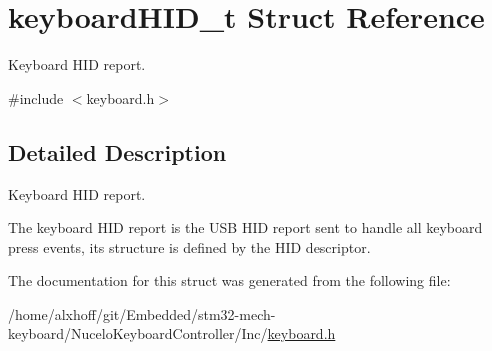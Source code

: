 \hypertarget{structkeyboardHID__t}{}\section{keyboard\+H\+I\+D\+\_\+t Struct Reference}
\label{structkeyboardHID__t}


Keyboard H\+ID report.  




{\ttfamily \#include $<$keyboard.\+h$>$}



\subsection{Detailed Description}
Keyboard H\+ID report. 

The keyboard H\+ID report is the U\+SB H\+ID report sent to handle all keyboard press events, its structure is defined by the H\+ID descriptor. 

The documentation for this struct was generated from the following file\+:\begin{DoxyCompactItemize}
\item 
/home/alxhoff/git/\+Embedded/stm32-\/mech-\/keyboard/\+Nucelo\+Keyboard\+Controller/\+Inc/\hyperlink{keyboard_8h}{keyboard.\+h}\end{DoxyCompactItemize}
